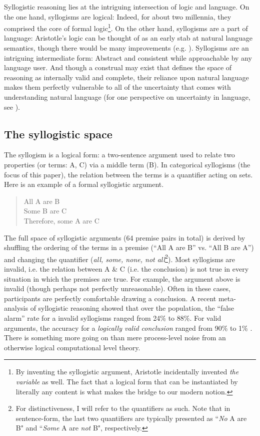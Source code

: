 \documentclass{llncs} %
\begin{document}
Syllogistic reasoning lies at the intriguing intersection of logic and language. On the one hand, syllogisms are logical: Indeed, for about two millennia, they comprised the core of formal logic\footnote{By inventing the syllogistic argument, Aristotle incidentally invented \emph{the variable} as well. The fact that a logical form that can be instantiated by literally any content is what makes the bridge to our modern notion.}. On the other hand, syllogisms are a part of language: Aristotle's logic can be thought of as an early stab at natural language semantics, though there would be many improvements (e.g. \cite{Horn1989}). Syllogisms are an intriguing intermediate form: Abstract and consistent while approachable by any language user. And though a construal may exist that defines the space of reasoning as internally valid and complete, their reliance upon natural language makes them perfectly vulnerable to all of the uncertainty that comes with understanding natural language (for one perspective on uncertainty in language, see \cite{GoodLass2015}).

\subsection{The syllogistic space}

The syllogism is a logical form: a two-sentence argument used to relate two properties (or terms: A, C) via a middle term (B). In categorical syllogisms (the focus of this paper), the relation between the terms is a quantifier acting on sets. Here is an example of a formal syllogistic argument.
\begin{quote}
All A are B\\
Some B are C\\
Therefore, some A are C
\end{quote}
The full space of syllogistic arguments (64 premise pairs in total) is derived by shuffling the ordering of the terms in a premise (``All A are B'' vs. ``All B are A'') and changing the quantifier (\emph{all, some, none, not all}\footnote{For distinctiveness, I will refer to the quantifiers as such. Note that in sentence-form, the last two quantifiers are typically presented as ``\emph{No} A are B" and ``\emph{Some} A are \emph{not} B", respectively.}). Most syllogisms are invalid, i.e. the relation between A \& C (i.e. the conclusion) is not true in every situation in which the premises are true. For example, the argument above is invalid (though perhaps not perfectly unreasonable). Often in these cases, participants are perfectly comfortable drawing a conclusion. A recent meta-analysis of syllogistic reasoning showed that over the population, the ``false alarm'' rate for a invalid syllogisms ranged from 24\% to 88\%. For valid arguments, the accuracy for a \emph{logically valid conclusion} ranged from 90\% to 1\% \cite{Khemlani2012}. There is something more going on than mere process-level noise from an otherwise logical computational level theory.
\end{document}
